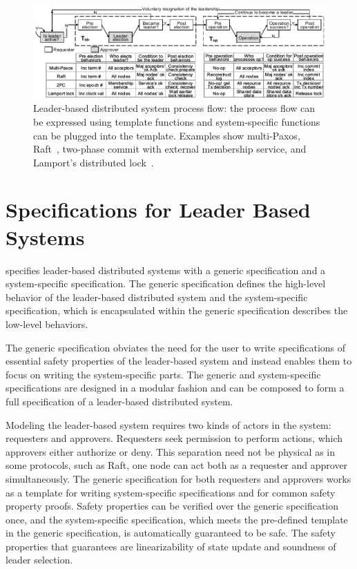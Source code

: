 
\begin{figure}
\includegraphics{figs/witnesspassing/overviewfig}
\vspace{-1em}
\caption{Leader-based distributed system process flow: the process flow can be
	expressed using template functions and system-specific functions can
	be plugged into the template. Examples show multi-Paxos, 
	Raft~\cite{raft}, two-phase commit with external membership service, 
	and Lamport's distributed lock~\cite{lamportclock}.}
\label{fig:process-flow}
\vspace{-1em}
\end{figure}

\section{Specifications for Leader Based Systems}
\label{sec:specs-for-leader-based-system}

\sysname{} specifies leader-based distributed systems with a generic
specification and a system-specific specification. 
The generic specification defines the high-level behavior of the leader-based 
distributed system and the system-specific specification, which is encapsulated 
within the generic specification describes the low-level behaviors. 

The generic specification obviates the need for the user to write specifications
of essential safety properties of the leader-based system and instead enables them to
focus on writing the system-specific parts. The
generic and system-specific specifications are designed in a modular fashion and
can be composed to form a full specification of a leader-based distributed system.

Modeling the leader-based system requires two kinds of actors in the system:
requesters and approvers. 
Requesters seek permission to perform actions, which approvers either authorize or deny.
This separation need not be physical as in some protocols, such as Raft, one node can act
both as a requester and approver simultaneously.
The generic specification for both requesters and approvers 
works as a template for writing system-specific
specifications and for common safety property proofs.
Safety properties can be verified over the generic specification once,
and the system-specific specification, which meets the pre-defined template in
the generic specification, is automatically guaranteed to be safe. The safety
properties that \sysname{} guarantees are linearizability of state update and
soundness of leader selection.

